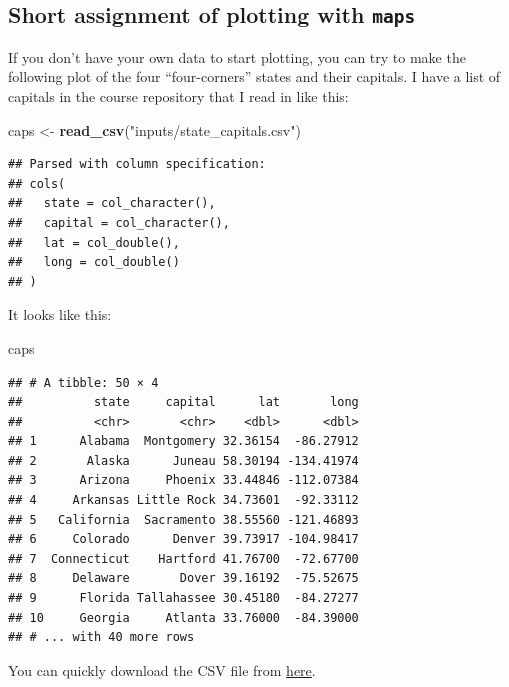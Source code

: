 \documentclass[]{book}
\newenvironment{Shaded}{\begin{snugshade}}{\end{snugshade}}
\newcommand{\KeywordTok}[1]{\textcolor[rgb]{0.13,0.29,0.53}{\textbf{{#1}}}}
\newcommand{\StringTok}[1]{\textcolor[rgb]{0.31,0.60,0.02}{{#1}}}
\newcommand{\NormalTok}[1]{{#1}}
\theoremstyle{definition}
\theoremstyle{definition}
\theoremstyle{remark}
\begin{document}
\subsection{\texorpdfstring{Short assignment of plotting with
\texttt{maps}}{Short assignment of plotting with maps}}\label{short-assignment-of-plotting-with-maps}

If you don't have your own data to start plotting, you can try to make
the following plot of the four ``four-corners'' states and their
capitals. I have a list of capitals in the course repository that I read
in like this:

\begin{Shaded}
\begin{Highlighting}[]
\NormalTok{caps <-}\StringTok{ }\KeywordTok{read_csv}\NormalTok{(}\StringTok{"inputs/state_capitals.csv"}\NormalTok{)}
\end{Highlighting}
\end{Shaded}

\begin{verbatim}
## Parsed with column specification:
## cols(
##   state = col_character(),
##   capital = col_character(),
##   lat = col_double(),
##   long = col_double()
## )
\end{verbatim}

It looks like this:

\begin{Shaded}
\begin{Highlighting}[]
\NormalTok{caps}
\end{Highlighting}
\end{Shaded}

\begin{verbatim}
## # A tibble: 50 × 4
##          state     capital      lat       long
##          <chr>       <chr>    <dbl>      <dbl>
## 1      Alabama  Montgomery 32.36154  -86.27912
## 2       Alaska      Juneau 58.30194 -134.41974
## 3      Arizona     Phoenix 33.44846 -112.07384
## 4     Arkansas Little Rock 34.73601  -92.33112
## 5   California  Sacramento 38.55560 -121.46893
## 6     Colorado      Denver 39.73917 -104.98417
## 7  Connecticut    Hartford 41.76700  -72.67700
## 8     Delaware       Dover 39.16192  -75.52675
## 9      Florida Tallahassee 30.45180  -84.27277
## 10     Georgia     Atlanta 33.76000  -84.39000
## # ... with 40 more rows
\end{verbatim}

You can quickly download the CSV file from
\href{https://www.dropbox.com/s/d3gehuzl4pdkntj/state_capitals.csv?dl=1}{here}.
\end{document}

